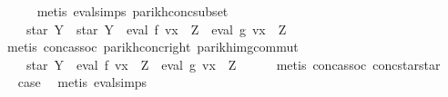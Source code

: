 \begin{isabellebody}
\ \ \ \ \isamarkupfalse%
\ {\isacharparenleft}{\kern0pt}metis\ eval{\isachardot}{\kern0pt}simps{\isacharparenleft}{\kern0pt}{}{\isacharparenright}{\kern0pt}\ parikh{\isacharunderscore}{\kern0pt}conc{\isacharunderscore}{\kern0pt}subset{\isacharparenright}{\kern0pt}\isanewline
\ \ \isamarkupfalse%
\ \isamarkupfalse%
\ {\isachardoublequoteopen}{\isasymdots}\ {\isacharequal}{\kern0pt}\ {\isasymPsi}\ {\isacharparenleft}{\kern0pt}star\ Y\ {\isacharat}{\kern0pt}{\isacharat}{\kern0pt}\ star\ Y\ {\isacharat}{\kern0pt}{\isacharat}{\kern0pt}\ eval\ f\ {\isacharparenleft}{\kern0pt}v{\isacharparenleft}{\kern0pt}x\ {\isacharcolon}{\kern0pt}{\isacharequal}{\kern0pt}\ Z{\isacharparenright}{\kern0pt}{\isacharparenright}{\kern0pt}\ {\isacharat}{\kern0pt}{\isacharat}{\kern0pt}\ eval\ g\ {\isacharparenleft}{\kern0pt}v{\isacharparenleft}{\kern0pt}x\ {\isacharcolon}{\kern0pt}{\isacharequal}{\kern0pt}\ Z{\isacharparenright}{\kern0pt}{\isacharparenright}{\kern0pt}{\isacharparenright}{\kern0pt}{\isachardoublequoteclose}\isanewline
\ \ \ \ \isamarkupfalse%
\ {\isacharparenleft}{\kern0pt}metis\ conc{\isacharunderscore}{\kern0pt}assoc\ parikh{\isacharunderscore}{\kern0pt}conc{\isacharunderscore}{\kern0pt}right\ parikh{\isacharunderscore}{\kern0pt}img{\isacharunderscore}{\kern0pt}commut{\isacharparenright}{\kern0pt}\isanewline
\ \ \isamarkupfalse%
\ \isamarkupfalse%
\ {\isachardoublequoteopen}{\isasymdots}\ {\isacharequal}{\kern0pt}\ {\isasymPsi}\ {\isacharparenleft}{\kern0pt}star\ Y\ {\isacharat}{\kern0pt}{\isacharat}{\kern0pt}\ eval\ f\ {\isacharparenleft}{\kern0pt}v{\isacharparenleft}{\kern0pt}x\ {\isacharcolon}{\kern0pt}{\isacharequal}{\kern0pt}\ Z{\isacharparenright}{\kern0pt}{\isacharparenright}{\kern0pt}\ {\isacharat}{\kern0pt}{\isacharat}{\kern0pt}\ eval\ g\ {\isacharparenleft}{\kern0pt}v{\isacharparenleft}{\kern0pt}x\ {\isacharcolon}{\kern0pt}{\isacharequal}{\kern0pt}\ Z{\isacharparenright}{\kern0pt}{\isacharparenright}{\kern0pt}{\isacharparenright}{\kern0pt}{\isachardoublequoteclose}\isanewline
\ \ \ \ \isamarkupfalse%
\ {\isacharparenleft}{\kern0pt}metis\ conc{\isacharunderscore}{\kern0pt}assoc\ conc{\isacharunderscore}{\kern0pt}star{\isacharunderscore}{\kern0pt}star{\isacharparenright}{\kern0pt}\isanewline
\ \ \isamarkupfalse%
\ \isamarkupfalse%
\ {\isacharquery}{\kern0pt}case\ \isamarkupfalse%
\ {\isacharparenleft}{\kern0pt}metis\ eval{\isachardot}{\kern0pt}simps{\isacharparenleft}{\kern0pt}{}{\isacharparenright}{\kern0pt}{\isacharparenright}{\kern0pt}\isanewline

\end{isabellebody}
